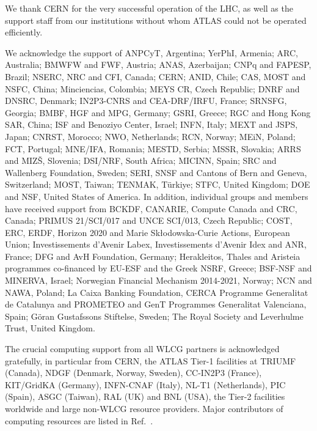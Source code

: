 

We thank CERN for the very successful operation of the LHC, as well as the
support staff from our institutions without whom ATLAS could not be
operated efficiently.

We acknowledge the support of 
ANPCyT, Argentina; 
YerPhI, Armenia; 
ARC, Australia; 
BMWFW and FWF, Austria; 
ANAS, Azerbaijan; 
CNPq and FAPESP, Brazil; 
NSERC, NRC and CFI, Canada; 
CERN; 
ANID, Chile; 
CAS, MOST and NSFC, China; 
Minciencias, Colombia; 
MEYS CR, Czech Republic; 
DNRF and DNSRC, Denmark; 
IN2P3-CNRS and CEA-DRF/IRFU, France; 
SRNSFG, Georgia; 
BMBF, HGF and MPG, Germany; 
GSRI, Greece; 
RGC and Hong Kong SAR, China; 
ISF and Benoziyo Center, Israel; 
INFN, Italy; 
MEXT and JSPS, Japan; 
CNRST, Morocco; 
NWO, Netherlands; 
RCN, Norway; 
MEiN, Poland; 
FCT, Portugal; 
MNE/IFA, Romania; 
MESTD, Serbia; 
MSSR, Slovakia; 
ARRS and MIZ\v{S}, Slovenia; 
DSI/NRF, South Africa; 
MICINN, Spain; 
SRC and Wallenberg Foundation, Sweden; 
SERI, SNSF and Cantons of Bern and Geneva, Switzerland; 
MOST, Taiwan; 
TENMAK, T\"urkiye; 
STFC, United Kingdom; 
DOE and NSF, United States of America. 
In addition, individual groups and members have received support from 
BCKDF, CANARIE, Compute Canada and CRC, Canada; 
PRIMUS 21/SCI/017 and UNCE SCI/013, Czech Republic; 
COST, ERC, ERDF, Horizon 2020 and Marie Sk{\l}odowska-Curie Actions, European Union; 
Investissements d'Avenir Labex, Investissements d'Avenir Idex and ANR, France; 
DFG and AvH Foundation, Germany; 
Herakleitos, Thales and Aristeia programmes co-financed by EU-ESF and the Greek NSRF, Greece; 
BSF-NSF and MINERVA, Israel; 
Norwegian Financial Mechanism 2014-2021, Norway; 
NCN and NAWA, Poland; 
La Caixa Banking Foundation, CERCA Programme Generalitat de Catalunya and PROMETEO and GenT Programmes Generalitat Valenciana, Spain; 
G\"{o}ran Gustafssons Stiftelse, Sweden; 
The Royal Society and Leverhulme Trust, United Kingdom.

The crucial computing support from all WLCG partners is acknowledged gratefully, in particular from CERN, the ATLAS Tier-1 facilities at TRIUMF (Canada), NDGF (Denmark, Norway, Sweden), CC-IN2P3 (France), KIT/GridKA (Germany), INFN-CNAF (Italy), NL-T1 (Netherlands), PIC (Spain), ASGC (Taiwan), RAL (UK) and BNL (USA), the Tier-2 facilities worldwide and large non-WLCG resource providers. Major contributors of computing resources are listed in Ref.~\cite{ATL-SOFT-PUB-2021-003}.

